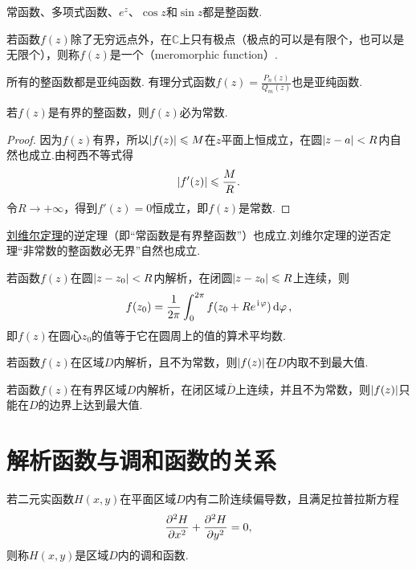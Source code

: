 \begin{example}
常函数、多项式函数、\(e^z\)、\(\cos z\)和\(\sin z\)都是整函数.
\end{example}

\begin{definition}
若函数\(f(z)\)除了无穷远点外，在\(\mathbb{C}\)上只有极点（极点的可以是有限个，也可以是无限个），则称\(f(z)\)是一个（meromorphic function）.
\end{definition}

\begin{example}
所有的整函数都是亚纯函数.
有理分式函数\(f(z) = \frac{P_n(z)}{Q_m(z)}\)也是亚纯函数.
\end{example}

\begin{theorem}[刘维尔定理]\label{theorem:解析函数的积分表示.刘维尔定理}
若\(f(z)\)是有界的整函数，则\(f(z)\)必为常数.
\begin{proof}
因为\(f(z)\)有界，所以\(\abs{f(z)} \leqslant M\)在\(z\)平面上恒成立，在圆\(\abs{z-a}<R\)内自然也成立.由柯西不等式得\[
\abs{f'(z)} \leqslant \frac{M}{R}.
\]令\(R\to+\infty\)，得到\(f'(z)=0\)恒成立，即\(f(z)\)是常数.
\end{proof}
\end{theorem}
\hyperref[theorem:解析函数的积分表示.刘维尔定理]{刘维尔定理}的逆定理（即“常函数是有界整函数”）也成立.刘维尔定理的逆否定理“非常数的整函数必无界”自然也成立.

\begin{theorem}[解析函数的平均值定理]\label{theorem:解析函数的积分表示.平均值定理}
若函数\(f(z)\)在圆\(\abs{z-z_0}<R\)内解析，在闭圆\(\abs{z-z_0} \leqslant R\)上连续，则\[
f(z_0) = \frac{1}{2\pi} \int_0^{2\pi} f(z_0+Re^{\kern1pt\mathrm{i}\kern1pt\varphi}) \dd{\varphi},
\]即\(f(z)\)在圆心\(z_0\)的值等于它在圆周上的值的算术平均数.
\end{theorem}

\begin{theorem}[最大模定理]\label{theorem:解析函数的积分表示.最大模定理}
若函数\(f(z)\)在区域\(D\)内解析，且不为常数，则\(\abs{f(z)}\)在\(D\)内取不到最大值.
\end{theorem}

\begin{corollary}\label{theorem:解析函数的积分表示.最大模定理推论}
若函数\(f(z)\)在有界区域\(D\)内解析，在闭区域\(\overline{D}\)上连续，并且不为常数，则\(\abs{f(z)}\)只能在\(D\)的边界上达到最大值.
\end{corollary}

\section{解析函数与调和函数的关系}
\begin{definition}
若二元实函数\(H(x,y)\)在平面区域\(D\)内有二阶连续偏导数，且满足拉普拉斯方程\[
\pdv[2]{H}{x} + \pdv[2]{H}{y} = 0,
\]则称\(H(x,y)\)是区域\(D\)内的调和函数.
\end{definition}

